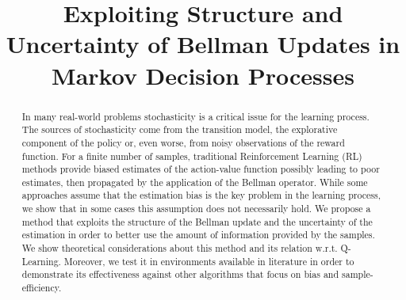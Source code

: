 \documentclass[conference]{IEEEtran}
\begin{document}
\title{Exploiting Structure and Uncertainty of Bellman Updates in Markov Decision Processes}

\author{
}

\maketitle

\begin{abstract}
In many real-world problems stochasticity is a critical issue for the learning process. The sources of stochasticity come from the transition model, the explorative component of the policy or, even worse, from noisy observations of the reward function. For a finite number of samples, traditional Reinforcement Learning (RL) methods provide biased estimates of the action-value function possibly leading to poor estimates, then propagated by the application of the Bellman operator. While some approaches assume that the estimation bias is the key problem in the learning process, we show that in some cases this assumption does not necessarily hold. We propose a method that exploits the structure of the Bellman update and the uncertainty of the estimation in order to better use the amount of information provided by the samples. We show theoretical considerations about this method and its relation w.r.t. Q-Learning. Moreover, we test it in environments available in literature in order to demonstrate its effectiveness against other algorithms that focus on bias and sample-efficiency.
\end{abstract}



%
\IEEEpeerreviewmaketitle
\end{document}
